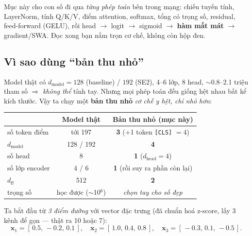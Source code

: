 \documentclass[11pt]{article}
\newcommand{\code}[1]{\textcolor{cInk}{\texttt{#1}}}
\theoremstyle{definition}
\begin{document}
Mục này cho con số đi qua \emph{từng phép toán} bên trong mạng: chiếu tuyến tính,
LayerNorm, tính Q/K/V, điểm attention, softmax, tổng có trọng số, residual,
feed-forward (GELU), rồi head $\to$ logit $\to$ sigmoid $\to$ \textbf{hàm mất
mát} $\to$ gradient/SWA. Đọc xong bạn nắm trọn cơ chế, không còn hộp đen.

\subsection{Vì sao dùng ``bản thu nhỏ''}
Model thật có $d_{\text{model}}=128$ (baseline) / $192$ (SE2), 4--6 lớp, 8 head,
$\sim$0.8--2.1 triệu tham số $\Rightarrow$ \emph{không thể} tính tay. Nhưng mọi
phép toán đều giống hệt nhau bất kể kích thước. Vậy ta chạy một
\textbf{bản thu nhỏ} \emph{cơ chế y hệt, chỉ nhỏ hơn}:
\begin{center}\small
\begin{tabular}{@{}l c c@{}}
\toprule
& Model thật & Bản thu nhỏ (mục này)\\
\midrule
số token điểm & tới 197 & \textbf{3} (+1 token \code{[CLS]} $=4$)\\
$d_{\text{model}}$ & 128 / 192 & \textbf{4}\\
số head & 8 & \textbf{1} ($d_{\text{head}}=4$)\\
số lớp encoder & 4 / 6 & \textbf{1} (rồi suy ra phần còn lại)\\
$d_{\text{ff}}$ & 512 & \textbf{2}\\
trọng số & học được ($\sim$10$^6$) & \emph{chọn tay cho số đẹp}\\
\bottomrule
\end{tabular}
\end{center}
Ta bắt đầu từ \emph{3 điểm đường} với vector đặc trưng (đã chuẩn hoá z-score, lấy
3 kênh để gọn --- thật ra 10 hoặc 7):
\[
\mathbf{x}_1=[\,0.5,\,-0.2,\,0.1\,],\quad
\mathbf{x}_2=[\,1.0,\,0.4,\,0.8\,],\quad
\mathbf{x}_3=[\,-0.3,\,0.1,\,-0.5\,].
\]

\end{document}
